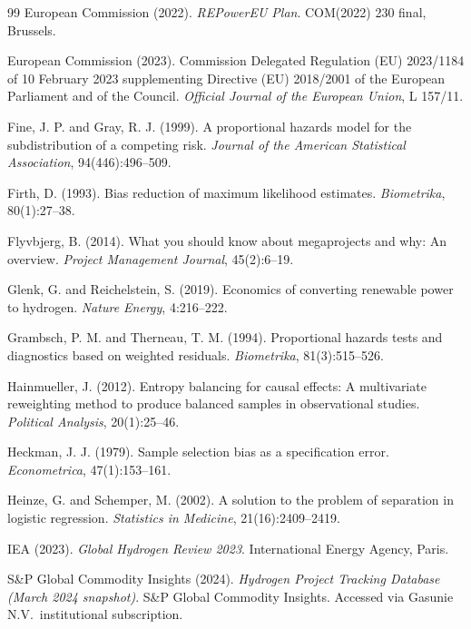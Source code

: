 \documentclass[11pt,a4paper]{article}
\begin{document}
\begin{thebibliography}{99}
European Commission (2022). \textit{REPowerEU Plan}. COM(2022) 230 final, Brussels.

European Commission (2023). Commission Delegated Regulation (EU) 2023/1184 of 10 February 2023 supplementing Directive (EU) 2018/2001 of the European Parliament and of the Council. \textit{Official Journal of the European Union}, L 157/11.

Fine, J. P. and Gray, R. J. (1999). A proportional hazards model for the subdistribution of a competing risk. \textit{Journal of the American Statistical Association}, 94(446):496--509.

Firth, D. (1993). Bias reduction of maximum likelihood estimates. \textit{Biometrika}, 80(1):27--38.

Flyvbjerg, B. (2014). What you should know about megaprojects and why: An overview. \textit{Project Management Journal}, 45(2):6--19.

Glenk, G. and Reichelstein, S. (2019). Economics of converting renewable power to hydrogen. \textit{Nature Energy}, 4:216--222.

Grambsch, P. M. and Therneau, T. M. (1994). Proportional hazards tests and diagnostics based on weighted residuals. \textit{Biometrika}, 81(3):515--526.

Hainmueller, J. (2012). Entropy balancing for causal effects: A multivariate reweighting method to produce balanced samples in observational studies. \textit{Political Analysis}, 20(1):25--46.

Heckman, J. J. (1979). Sample selection bias as a specification error. \textit{Econometrica}, 47(1):153--161.

Heinze, G. and Schemper, M. (2002). A solution to the problem of separation in logistic regression. \textit{Statistics in Medicine}, 21(16):2409--2419.

IEA (2023). \textit{Global Hydrogen Review 2023}. International Energy Agency, Paris.

S\&P Global Commodity Insights (2024). \textit{Hydrogen Project Tracking Database (March 2024 snapshot)}. S\&P Global Commodity Insights. Accessed via Gasunie N.V.\ institutional subscription.


\end{thebibliography}
\end{document}
